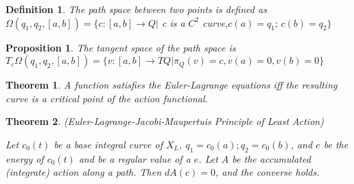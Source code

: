 \documentclass{article}
\newtheorem{thm}{Theorem}
\newtheorem{defn}{Definition}
\newtheorem{prop}{Proposition}
\begin{document}
\begin{defn}

The path space between two points is defined as $ \Omega(q_1, q_2, [a,b]) = \{c: [a,b] \to Q \vert $ c is a $C^2$ curve,$ c(a)=q_1; \hspace{2pt} c(b) = q_2 \} $

\end{defn}

\begin{prop}

The tangent space of the path space is $ T_c \Omega(q_1, q_2, [a,b]) = \{v:[a,b] \to TQ \vert \pi_Q(v)=c, v(a) = 0, v(b)=0 \}$

\end{prop}

\begin{thm}

A function satisfies the Euler-Lagrange equations iff the resulting curve is a critical point of the action functional.

\end{thm}

\begin{thm}{(Euler-Lagrange-Jacobi-Maupertuis Principle of Least Action)}

Let $c_0(t)$ be a base integral curve of $X_L$, $q_1 = c_0(a); q_2 = c_0(b)$, and $e$ be the energy of $c_0(t)$ and be a regular value of a $e$. Let $A$ be the accumulated (integrate) action along a path. Then $dA(c)=0$, and the converse holds.

\end{thm}
\end{document}
